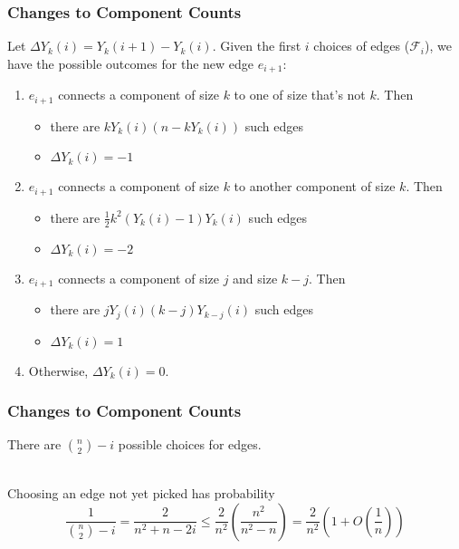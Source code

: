 \documentclass{beamer}
\begin{document}
\begin{frame}
\frametitle{Changes to Component Counts}

Let \(\Delta Y_{k}(i) = Y_{k}(i+1) - Y_{k}(i)\). Given the first \(i\) choices of edges (\(\mathcal{F}_{i}\)), we have the possible outcomes for the new edge \(e_{i+1}\):
\pause
\begin{enumerate}
    \item \(e_{i+1}\) connects a component of size \(k\) to one of size that's not \(k\). Then \pause 
      \begin{itemize}
        \item there are \(k Y_{k}(i) (n - k Y_{k}(i))\) such edges \pause
        \item \(\Delta Y_{k}(i) = -1\) \pause
      \end{itemize}
    \item \(e_{i+1}\) connects a component of size \(k\) to another component of size \(k\). Then \pause
    \begin{itemize}
      \item there are \(\frac{1}{2} k^{2} (Y_{k}(i) - 1) Y_{k}(i)\) such edges \pause
      \item \(\Delta Y_{k}(i) = -2\) \pause
    \end{itemize}
    \item \(e_{i+1}\) connects a component of size \(j\) and size \(k - j\). Then \pause
    \begin{itemize}
      \item there are \(j Y_{j}(i) (k - j) Y_{k-j}(i)\) such edges \pause
      \item \(\Delta Y_{k}(i) = 1\) \pause
    \end{itemize}
    \item Otherwise, \(\Delta Y_{k}(i) = 0\).
\end{enumerate}
\end{frame}


\begin{frame}
\frametitle{Changes to Component Counts}

There are \(\binom{n}{2} - i\) possible choices for edges. \\~\ \pause

Choosing an edge not yet picked has probability
\[\frac{1}{\binom{n}{2} - i} = \frac{2}{n^{2} + n - 2i} \leq \frac{2}{n^{2}} \left(\frac{n^{2}}{n^{2} - n} \right) =  \frac{2}{n^{2}} \left(1 + O(\frac{1}{n})\right)\]
\end{frame}
\end{document}

